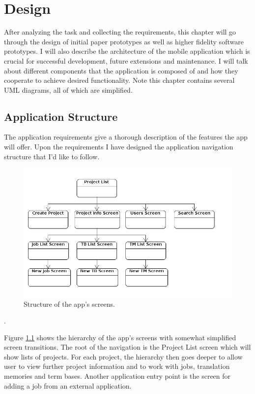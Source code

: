 
\chapter{Design}

After analyzing the task and collecting the requirements, this chapter will go through the design of initial paper prototypes as well as higher fidelity software prototypes. I will also describe the architecture of the mobile application which is crucial for successful development, future extensions and maintenance. I will talk about different components that the application is composed of and how they cooperate to achieve desired functionality. Note this chapter contains several UML diagrams, all of which are simplified.

\section{Application Structure}

The application requirements give a thorough description of the features the app will offer. Upon the requirements I have designed the application navigation structure that I'd like to follow.


\begin{figure}[H]
	\includegraphics[width=1\textwidth]{argoUml/structure}
	\caption{Structure of the app's screens.}
	\label{fig:structure}
\end{figure}.

Figure \ref{fig:structure} shows the hierarchy of the app's screens with somewhat simplified screen transitions. The root of the navigation is the Project List screen which will show lists of projects. For each project, the hierarchy then goes deeper to allow user to view further project information and to work with jobs, translation memories and term bases. Another application entry point is the screen for adding a job from an external application.

